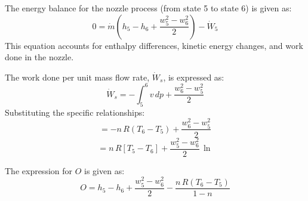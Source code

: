 The energy balance for the nozzle process (from state 5 to state 6) is given as:  
\[
0 = \dot{m} \left( h_5 - h_6 + \frac{w_5^2 - w_6^2}{2} \right) - \dot{W}_5
\]  
This equation accounts for enthalpy differences, kinetic energy changes, and work done in the nozzle.

The work done per unit mass flow rate, \( \dot{W}_s \), is expressed as:  
\[
\dot{W}_s = - \int_5^6 v \, dp + \frac{w_6^2 - w_5^2}{2}
\]  
Substituting the specific relationships:  
\[
= - n \, R \left( T_6 - T_5 \right) + \frac{w_6^2 - w_5^2}{2}
\]  
\[
= n \, R \left[ T_5 - T_6 \right] + \frac{w_5^2 - w_6^2}{2} \, \ln
\]  

The expression for \( O \) is given as:  
\[
O = h_5 - h_6 + \frac{w_5^2 - w_6^2}{2} - \frac{n \, R \left( T_6 - T_5 \right)}{1 - n}
\]